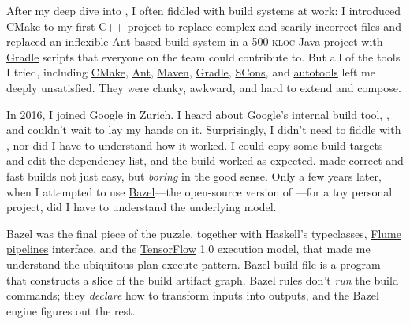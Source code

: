 \documentclass{article}
\begin{document}
After my deep dive into , I often fiddled with build systems at work:
I introduced \href{https://cmake.org/}{CMake} to my first C++ project to replace complex and scarily incorrect  files and
replaced an inflexible \href{https://ant.apache.org/}{Ant}-based build system in a 500 \textsc{kloc} Java project with \href{https://gradle.org/}{Gradle} scripts that everyone on the team could contribute to.
But all of the tools I tried, including \href{https://cmake.org/}{CMake}, \href{https://ant.apache.org/}{Ant}, \href{https://maven.apache.org/}{Maven}, \href{https://gradle.org/}{Gradle}, \href{https://www.scons.org/}{SCons}, and \href{https://www.gnu.org/software/automake/manual/html_node/Autotools-Introduction.html}{autotools} left me deeply unsatisfied.
They were clanky, awkward, and hard to extend and compose.

In 2016, I joined Google in Zurich.
I heard about Google's internal build tool, , and couldn't wait to lay my hands on it.
Surprisingly, I didn't need to fiddle with , nor did I have to understand how it worked.
I could copy some build targets and edit the dependency list, and the build worked as expected.
 made correct and fast builds not just easy, but \emph{boring} in the good sense.
Only a few years later, when I attempted to use \href{https://bazel.build/}{Bazel}---the open-source version of ---for a toy personal project, did I have to understand the underlying model.

Bazel was the final piece of the puzzle, together with Haskell's typeclasses, \href{https://research.google/pubs/flumejava-easy-efficient-data-parallel-pipelines/}{Flume pipelines} interface,  and the \href{https://www.tensorflow.org/}{TensorFlow} 1.0 execution model, that made me understand the ubiquitous plan-execute pattern.
Bazel build file is a program that constructs a slice of the build artifact graph.
Bazel rules don't \emph{run} the build commands; they \emph{declare} how to transform inputs into outputs, and the Bazel engine figures out the rest.
\end{document}
